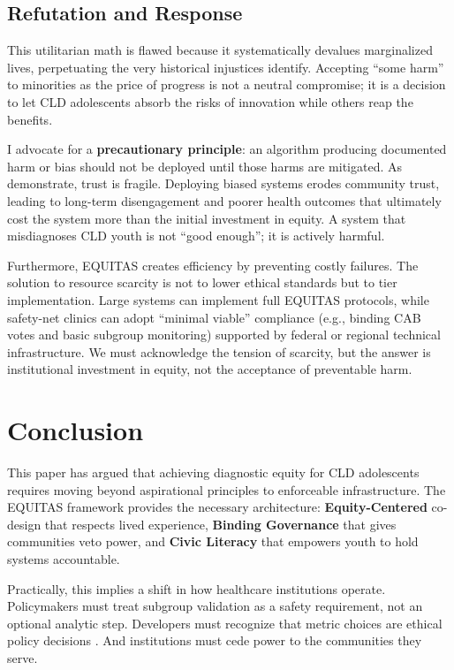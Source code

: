 \documentclass[12pt, letterpaper]{article}
\begin{document}
\subsection{Refutation and Response}
This utilitarian math is flawed because it systematically devalues marginalized lives, perpetuating the very historical injustices \cite{marko2025} identify. Accepting ``some harm'' to minorities as the price of progress is not a neutral compromise; it is a decision to let CLD adolescents absorb the risks of innovation while others reap the benefits.

I advocate for a \textbf{precautionary principle}: an algorithm producing documented harm or bias should not be deployed until those harms are mitigated. As \cite{sagona2025} demonstrate, trust is fragile. Deploying biased systems erodes community trust, leading to long-term disengagement and poorer health outcomes that ultimately cost the system more than the initial investment in equity. A system that misdiagnoses CLD youth is not ``good enough''; it is actively harmful.

Furthermore, EQUITAS creates efficiency by preventing costly failures. The solution to resource scarcity is not to lower ethical standards but to tier implementation. Large systems can implement full EQUITAS protocols, while safety-net clinics can adopt ``minimal viable'' compliance (e.g., binding CAB votes and basic subgroup monitoring) supported by federal or regional technical infrastructure. We must acknowledge the tension of scarcity, but the answer is institutional investment in equity, not the acceptance of preventable harm.

\section{Conclusion}

This paper has argued that achieving diagnostic equity for CLD adolescents requires moving beyond aspirational principles to enforceable infrastructure. The EQUITAS framework provides the necessary architecture: \textbf{Equity-Centered} co-design that respects lived experience, \textbf{Binding Governance} that gives communities veto power, and \textbf{Civic Literacy} that empowers youth to hold systems accountable.

Practically, this implies a shift in how healthcare institutions operate. Policymakers must treat subgroup validation as a safety requirement, not an optional analytic step. Developers must recognize that metric choices are ethical policy decisions \citep{chen2023}. And institutions must cede power to the communities they serve.
\end{document}
